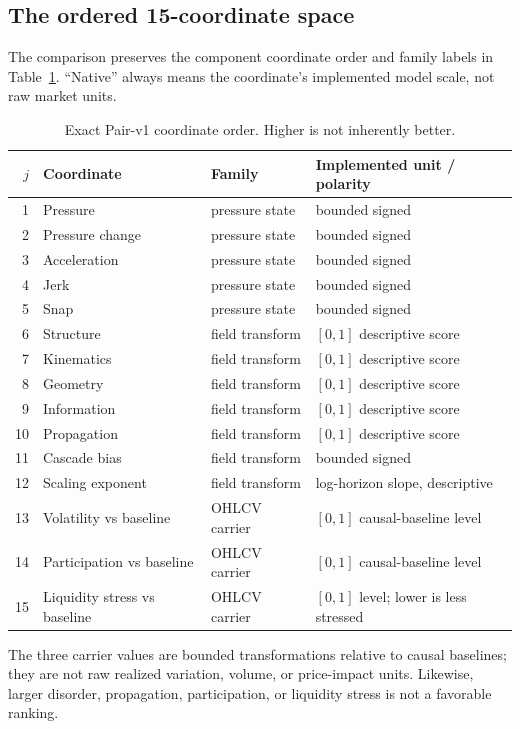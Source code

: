 \documentclass{article}
\begin{document}
\subsection{The ordered 15-coordinate space}

The comparison preserves the component coordinate order and family labels in Table~\ref{tab:coordinates}. ``Native'' always means the coordinate's implemented model scale, not raw market units.

\begin{table}[h]
\centering
\small
\setlength{\tabcolsep}{3.5pt}
\begin{tabular}{rlll}
\toprule
$j$ & Coordinate & Family & Implemented unit / polarity \\
\midrule
1 & Pressure & pressure state & bounded signed \\
2 & Pressure change & pressure state & bounded signed \\
3 & Acceleration & pressure state & bounded signed \\
4 & Jerk & pressure state & bounded signed \\
5 & Snap & pressure state & bounded signed \\
6 & Structure & field transform & $[0,1]$ descriptive score \\
7 & Kinematics & field transform & $[0,1]$ descriptive score \\
8 & Geometry & field transform & $[0,1]$ descriptive score \\
9 & Information & field transform & $[0,1]$ descriptive score \\
10 & Propagation & field transform & $[0,1]$ descriptive score \\
11 & Cascade bias & field transform & bounded signed \\
12 & Scaling exponent & field transform & log-horizon slope, descriptive \\
13 & Volatility vs baseline & OHLCV carrier & $[0,1]$ causal-baseline level \\
14 & Participation vs baseline & OHLCV carrier & $[0,1]$ causal-baseline level \\
15 & Liquidity stress vs baseline & OHLCV carrier & $[0,1]$ level; lower is less stressed \\
\bottomrule
\end{tabular}
\caption{Exact Pair-v1 coordinate order. Higher is not inherently better.}
\label{tab:coordinates}
\end{table}

The three carrier values are bounded transformations relative to causal baselines; they are not raw realized variation, volume, or price-impact units. Likewise, larger disorder, propagation, participation, or liquidity stress is not a favorable ranking.
\end{document}
